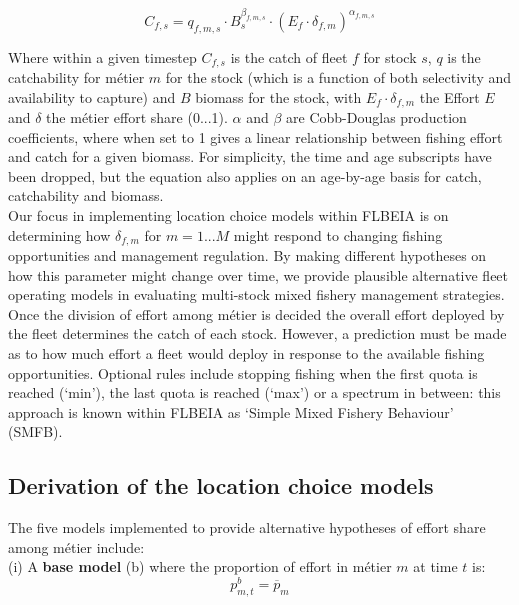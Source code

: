 \documentclass[12pt, halfline, a4paper]{ouparticle}
\begin{document}
\begin{equation}
 C_{f,s} = q_{f,m,s}\cdot B_{s}^{\beta_{f,m,s}} \cdot \left(E_{f}\cdot
	 \delta_{f,m} \right)^{\alpha_{f,m,s}}	
\end{equation}

Where within a given timestep $C_{f,s}$ is the catch of fleet $f$ for stock
$s$, $q$ is the catchability for métier $m$ for the stock (which is a function
of both selectivity and availability to capture) and $B$ biomass for the stock,
with $E_{f}\cdot \delta_{f,m}$ the Effort $E$ and $\delta$ the métier effort
share (0...1). $\alpha$ and $\beta$ are Cobb-Douglas production coefficients,
where when set to 1 gives a linear relationship between fishing effort and
catch for a given biomass. For simplicity, the time and age subscripts have
been dropped, but the equation also applies on an age-by-age basis for catch,
catchability and biomass. \\

Our focus in implementing location choice models within FLBEIA is on
determining how $\delta_{f,m}$ for $m=1...M$ might respond to changing fishing
opportunities and management regulation. By making different hypotheses on how
this parameter might change over time, we provide plausible alternative fleet
operating models in evaluating multi-stock mixed fishery management strategies.
\\

Once the division of effort among métier is decided the overall effort deployed
by the fleet determines the catch of each stock. However, a prediction must be
made as to how much effort a fleet would deploy in response to the available
fishing opportunities. Optional rules include stopping fishing when the first
quota is reached (`min'), the last quota is reached (`max') or a spectrum in
between: this approach is known within FLBEIA as `Simple Mixed Fishery
Behaviour' (SMFB).

\subsection{Derivation of the location choice models}

The five models implemented to provide alternative hypotheses of effort share
among métier include:\\

(i) A \textbf{base model} (b) where the proportion of effort in métier $m$ at time
$t$ is:
\begin{equation}
p^{b}_{m,t} = \overline{p}_{m}
\end{equation}
\end{document}

